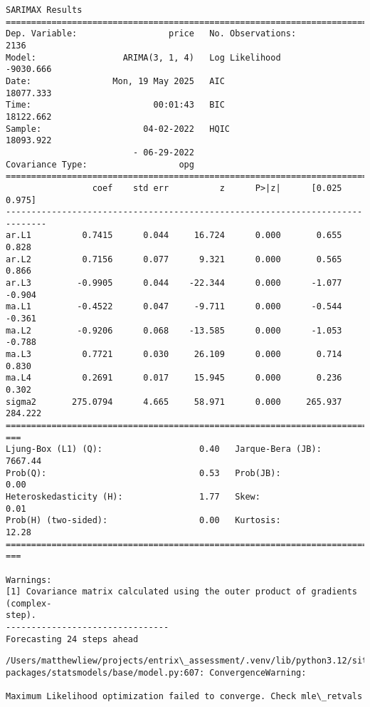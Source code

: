 \documentclass[11pt]{article}
\begin{document}
    \begin{Verbatim}[commandchars=\\\{\}]
                               SARIMAX Results
==============================================================================
Dep. Variable:                  price   No. Observations:                 2136
Model:                 ARIMA(3, 1, 4)   Log Likelihood               -9030.666
Date:                Mon, 19 May 2025   AIC                          18077.333
Time:                        00:01:43   BIC                          18122.662
Sample:                    04-02-2022   HQIC                         18093.922
                         - 06-29-2022
Covariance Type:                  opg
==============================================================================
                 coef    std err          z      P>|z|      [0.025      0.975]
------------------------------------------------------------------------------
ar.L1          0.7415      0.044     16.724      0.000       0.655       0.828
ar.L2          0.7156      0.077      9.321      0.000       0.565       0.866
ar.L3         -0.9905      0.044    -22.344      0.000      -1.077      -0.904
ma.L1         -0.4522      0.047     -9.711      0.000      -0.544      -0.361
ma.L2         -0.9206      0.068    -13.585      0.000      -1.053      -0.788
ma.L3          0.7721      0.030     26.109      0.000       0.714       0.830
ma.L4          0.2691      0.017     15.945      0.000       0.236       0.302
sigma2       275.0794      4.665     58.971      0.000     265.937     284.222
================================================================================
===
Ljung-Box (L1) (Q):                   0.40   Jarque-Bera (JB):
7667.44
Prob(Q):                              0.53   Prob(JB):
0.00
Heteroskedasticity (H):               1.77   Skew:
0.01
Prob(H) (two-sided):                  0.00   Kurtosis:
12.28
================================================================================
===

Warnings:
[1] Covariance matrix calculated using the outer product of gradients (complex-
step).
--------------------------------
Forecasting 24 steps ahead
    \end{Verbatim}

    \begin{Verbatim}[commandchars=\\\{\}]
/Users/matthewliew/projects/entrix\_assessment/.venv/lib/python3.12/site-
packages/statsmodels/base/model.py:607: ConvergenceWarning:

Maximum Likelihood optimization failed to converge. Check mle\_retvals

    \end{Verbatim}
\end{document}
